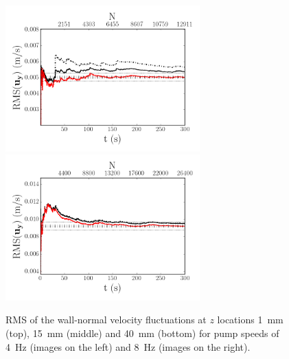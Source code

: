 \documentclass[12pt,oneside,a4paper]{article}
\begin{document}
\begin{figure}
\includegraphics[width=7.5cm]{images/LDA_timeDependenceImages/4hz_x_400_z_40_RMSuy.png}\hfill
\includegraphics[width=7.5cm]{images/LDA_timeDependenceImages/8hz_x_400_z_40_RMSuy.png}\\
\caption{RMS of the wall-normal velocity fluctuations at $z$ locations \SI{1}{mm} (top), \SI{15}{mm} (middle) and \SI{40}{mm} (bottom) for pump speeds of \SI{4}{Hz} (images on the left) and \SI{8}{Hz} (images on the right).}
\label{figure:experiments:timeDependence:RMSuy}
\end{figure}
\end{document}
